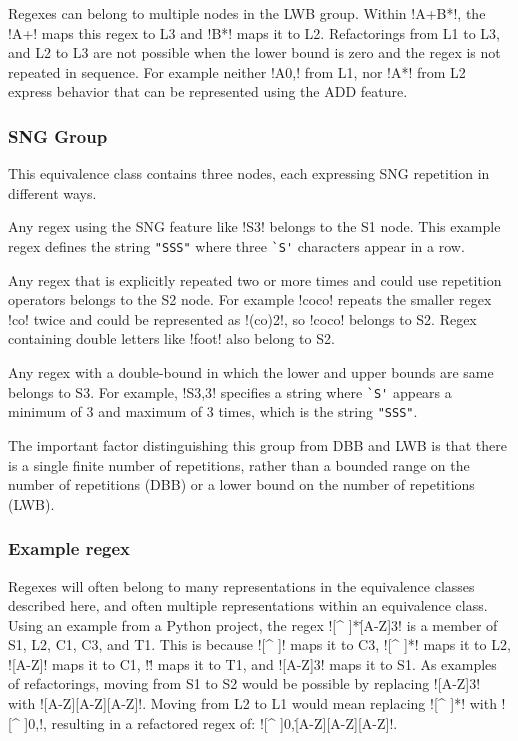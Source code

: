 Regexes can belong to multiple nodes in the LWB group.  Within \cverb!A+B*!, the \cverb!A+! maps this regex to L3 and \cverb!B*! maps it to L2. Refactorings from L1 to L3, and L2 to L3 are not possible when the lower bound is zero and the regex is not repeated in sequence.  For example neither \cverb!A{0,}! from L1, nor \cverb!A*! from L2 express behavior that can be represented using the ADD feature.

\subsubsection{SNG Group} This equivalence class contains three nodes, each expressing SNG repetition in different ways.

\begin{description}  \itemsep -1pt
\item[S1:] Any regex using the SNG feature like \cverb!S{3}! belongs to the S1 node. This example regex defines the string \verb!"SSS"! where three \verb!`S'! characters appear in a row.
\item[S2:] Any regex that is explicitly repeated two or more times and could use repetition operators belongs to the S2 node.  For example \cverb!coco! repeats the smaller regex \cverb!co! twice and could be represented as \cverb!(co){2}!, so \cverb!coco! belongs to S2.  Regex containing double letters like \cverb!foot! also belong to S2.
\item[S3:] Any regex with a double-bound in which the lower and upper bounds are same belongs to S3. For example, \cverb!S{3,3}! specifies a string where \verb!`S'! appears a minimum of 3 and maximum of 3 times, which is the string \verb!"SSS"!.
\end{description}

The important factor distinguishing this group from DBB and LWB is that there is a single finite number of repetitions, rather than a bounded range on the number of repetitions (DBB) or a lower bound on the number of repetitions (LWB).

\subsubsection{Example regex}
Regexes will often belong to many representations in the equivalence classes described here, and often multiple representations within an equivalence class.
Using an example from a Python project, the regex \cverb![^ ]*\.[A-Z]{3}! is a member of S1, L2, C1, C3, and T1. This is because \cverb![^ ]! maps it to C3, \cverb![^ ]*! maps it to L2, \cverb![A-Z]! maps it to C1, \cverb!\.! maps it to T1, and \cverb![A-Z]{3}! maps it to S1.
As examples of refactorings, moving from S1 to S2 would be possible by replacing \cverb![A-Z]{3}! with \cverb![A-Z][A-Z][A-Z]!.  Moving from L2 to L1 would mean replacing \cverb![^ ]*! with \cverb![^ ]{0,}!, resulting in a refactored regex of: \cverb![^ ]{0,}\.[A-Z][A-Z][A-Z]!.
